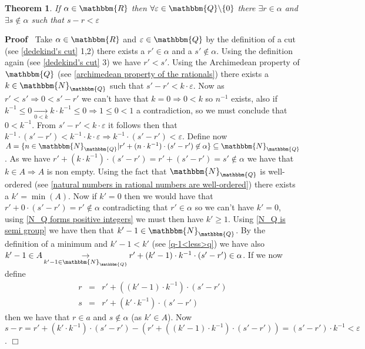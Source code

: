 \documentclass{book}
\newcommand{\Rightarrowlim}{\mathop{\rightarrow}\limits}
\newcommand{\nin}{\not\in}
\newcommand{\nobracket}{}
\newcommand{\um}{-}
\newcommand{\upl}{+}
\newenvironment{proof}{\noindent\textbf{Proof\ }}{\hspace*{\fill}$\Box$\medskip}
\newtheorem{theorem}{Theorem}
\begin{document}
{{\begin{theorem}
  \label{gap theorem}If $\alpha \in \mathbbm{R}$ then $\forall \varepsilon \in
  \mathbbm{Q} \backslash \{ 0 \}$ there $\exists r \in \alpha$ and $\exists s
  \nin \alpha$ such that $s - r < \varepsilon$
\end{theorem}

\begin{proof}
  Take $\alpha \in \mathbbm{R}$ and $\varepsilon \in \mathbbm{Q}$ by the
  definition of a cut (see \ref{dedekind's cut} 1,2) there exists a $r' \in
  \alpha$ and a $s' \nin \alpha$. Using the definition again (see
  \ref{dedekind's cut} 3) we have $r' < s'$. Using the Archimedean property of
  $\mathbbm{Q}$ (see \ref{archimedean property of the rationals}) there exists
  a $k \in \mathbbm{N}_{\mathbbm{Q}}$ such that $s' \um r' < k \cdot
  \varepsilon$. Now as $r' < s' \Rightarrow 0 < s' - r'$ we can't have that $k
  = 0 \Rightarrow 0 < k$ so $n^{\um 1}$ exists, also if $k^{\um 1} \leqslant 0
  \Rightarrowlim_{0 < k} k \cdot k^{\um 1} \leqslant 0 \Rightarrow 1 \leqslant
  0 < 1$ a contradiction, so we must conclude that $0 < k^{- 1}$. From $s' -
  r' < k \cdot \varepsilon$ it follows then that $k^{- 1} \cdot (s' \um r') <
  k^{- 1} \cdot k \cdot \varepsilon \Rightarrow k^{- 1} \cdot (s' \um r') <
  \varepsilon$. Define now $A = \{ n \in \mathbbm{N}_{\mathbbm{Q}} | r' \upl
  (n \cdot k^{- 1}) \cdot (s' - r') \nin \alpha \nobracket \} \subseteq
  \mathbbm{N}_{\mathbbm{Q}}$. As we have $r' + (k \cdot k^{- 1}) \cdot (s' -
  r') = r' \upl (s' \um r') = s' \nin \alpha$ we have that $k \in A
  \Rightarrow A$ is non empty. Using the fact that $\mathbbm{N}_{\mathbbm{Q}}$
  is well-ordered (see \ref{natural numbers in rational numbers are
  well-ordered}) there exists a $k' = \min (A)$. Now if $k' = 0$ then we would
  have that $r' \upl 0 \cdot (s' \um r') = r' \nin \alpha$ contradicting that
  $r' \in \alpha$ so we can't have $k' = 0$, using \ref{N_Q forms positive
  integers} we must then have $k' \geqslant 1$. Using \ref{N_Q is semi group}
  we have then that $k' \um 1 \in \mathbbm{N}_{\mathbbm{Q}}$. By the
  definition of a minimum and $k' \um 1 < k'$ (see \ref{q-1<less>q}) we have
  also $k' - 1 \in A \Rightarrowlim_{k' - 1 \in \mathbbm{N}_{\mathbbm{Q}}} r'
  \upl (k' \um 1) \cdot k^{- 1} \cdot (s' - r') \in \alpha$. If we now define
  \begin{eqnarray*}
    r & = & r' \upl ((k' \um 1) \cdot k^{- 1}) \cdot (s' - r')\\
    s & = & r' + (k' \cdot k^{- 1}) \cdot (s' - r')
  \end{eqnarray*}
  then we have that $r \in a$ and $s \nin \alpha$ (as $k' \in A$). Now $s - r
  = r' + (k' \cdot k^{- 1}) \cdot (s' - r') - (r' \upl ((k' \um 1) \cdot k^{-
  1}) \cdot (s' - r')) = (s' - r') \cdot k^{- 1} < \varepsilon$.
\end{proof}

}}
\end{document}
